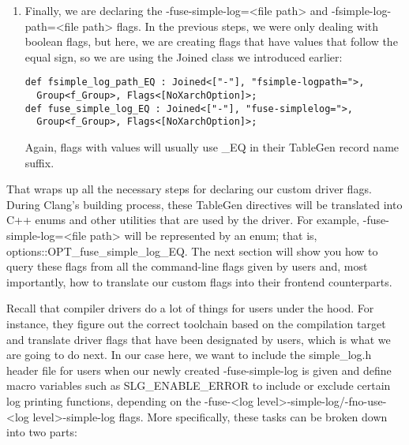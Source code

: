 \begin{enumerate}
\item Finally, we are declaring the -fuse-simple-log=<file path> and -fsimple-log-path=<file path> flags. In the previous steps, we were only dealing with boolean flags, but here, we are creating flags that have values that follow the equal sign, so we are using the Joined class we introduced earlier:

\begin{lstlisting}[style=styleJavaScript]
def fsimple_log_path_EQ : Joined<["-"], "fsimple-logpath=">, 
  Group<f_Group>, Flags<[NoXarchOption]>;
def fuse_simple_log_EQ : Joined<["-"], "fuse-simplelog=">, 
  Group<f_Group>, Flags<[NoXarchOption]>;
\end{lstlisting}

Again, flags with values will usually use \_EQ in their TableGen record name suffix.

\end{enumerate}

That wraps up all the necessary steps for declaring our custom driver flags. During Clang's building process, these TableGen directives will be translated into C++ enums and other utilities that are used by the driver. For example, -fuse-simple-log=<file path> will be represented by an enum; that is, options::OPT\_fuse\_simple\_log\_EQ. The next section will show you how to query these flags from all the command-line flags given by users and, most importantly, how to translate our custom flags into their frontend counterparts.


Recall that compiler drivers do a lot of things for users under the hood. For instance, they figure out the correct toolchain based on the compilation target and translate driver flags that have been designated by users, which is what we are going to do next. In our case here, we want to include the simple\_log.h header file for users when our newly created -fuse-simple-log is given and define macro variables such as SLG\_ENABLE\_ERROR to include or exclude certain log printing functions, depending on the -fuse-<log level>-simple-log/-fno-use-<log level>-simple-log flags. More specifically, these tasks can be broken down into two parts:

